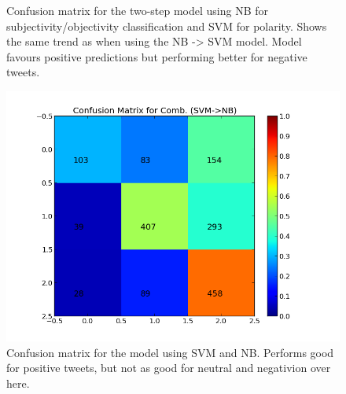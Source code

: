 \begin{minipage}[!htb]{\linewidth}
\begin{minipage}{0.45\linewidth}
\begin{figure}[H]
           \caption[Plot showing the confusion matrix for two-step NB -> MaxEnt]{Confusion matrix for the two-step model using NB for subjectivity/objectivity classification and SVM for polarity. Shows the same trend as when using the NB -> SVM model. Model favours positive predictions but performing better for negative tweets.}
           \label{fig:confmat_nb_maxent}
          \end{figure}
     \end{minipage}
\end{minipage}

\begin{minipage}[!htb]{\linewidth}
     \centering
     \begin{minipage}{0.45\linewidth}
           \begin{figure}[H]
                \includegraphics[width=\linewidth]{../img/plots/grid/confusion_matrix_Comb-SVM-NB.png}
        		\caption[Plot showing the confusion matrix for two-step SVM -> NB]{Confusion matrix for the model using SVM and NB. Performs good for positive tweets, but not as good for neutral and negativion over here.}
            \label{fig:confmat_svm_nb}
           \end{figure}
      \end{minipage}
      \hspace{0.05\linewidth}
      \begin{minipage}{0.45\linewidth}
           \begin{figure}[H]

\end{figure}
\end{minipage}
\end{minipage}
